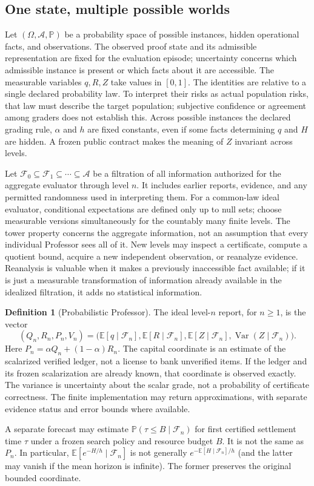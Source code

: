 \documentclass[11pt,letterpaper]{article}
\theoremstyle{definition}\newtheorem{definition}[theorem]{Definition}\newtheorem{example}[theorem]{Example}\newtheorem{conjecture}[theorem]{Conjecture}
\newcommand{\E}{\mathbb E}\newcommand{\PP}{\mathbb P}\newcommand{\F}{\mathcal F}\newcommand{\Var}{\operatorname{Var}}\newcommand{\PC}{\operatorname{PC}}\newcommand{\N}{\mathbb N}
\begin{document}
\subsection{One state, multiple possible worlds}
Let $(\Omega,\mathcal A,\PP)$ be a probability space of possible instances, hidden operational facts, and observations. The observed proof state and its admissible representation are fixed for the evaluation episode; uncertainty concerns which admissible instance is present or which facts about it are accessible. The measurable variables $q,R,Z$ take values in $[0,1]$. The identities are relative to a single declared probability law. To interpret their risks as actual population risks, that law must describe the target population; subjective confidence or agreement among graders does not establish this. Across possible instances the declared grading rule, $\alpha$ and $h$ are fixed constants, even if some facts determining $q$ and $H$ are hidden. A frozen public contract makes the meaning of $Z$ invariant across levels.

Let $\F_0\subseteq\F_1\subseteq\cdots\subseteq\mathcal A$ be a filtration of all information authorized for the aggregate evaluator through level $n$. It includes earlier reports, evidence, and any permitted randomness used in interpreting them. For a common-law ideal evaluator, conditional expectations are defined only up to null sets; choose measurable versions simultaneously for the countably many finite levels. The tower property concerns the aggregate information, not an assumption that every individual Professor sees all of it. New levels may inspect a certificate, compute a quotient bound, acquire a new independent observation, or reanalyze evidence. Reanalysis is valuable when it makes a previously inaccessible fact available; if it is just a measurable transformation of information already available in the idealized filtration, it adds no statistical information.
\begin{definition}[Probabilistic Professor]
The ideal level-$n$ report, for $n\geq1$, is the vector
\[
 (Q_n,R_n,P_n,V_n)=\big(\E[q\mid\F_n],\E[R\mid\F_n],\E[Z\mid\F_n],\Var(Z\mid\F_n)\big).
\]
Here $P_n=\alpha Q_n+(1-\alpha)R_n$. The capital coordinate is an estimate of the scalarized verified ledger, not a license to bank unverified items. If the ledger and its frozen scalarization are already known, that coordinate is observed exactly. The variance is uncertainty about the scalar grade, not a probability of certificate correctness. The finite implementation may return approximations, with separate evidence status and error bounds where available.
\end{definition}
A separate forecast may estimate $\PP(\tau\leq B\mid\F_n)$ for first certified settlement time $\tau$ under a frozen search policy and resource budget $B$. It is not the same as $P_n$. In particular, $\E[e^{-H/h}\mid\F_n]$ is not generally $e^{-\E[H\mid\F_n]/h}$ (and the latter may vanish if the mean horizon is infinite). The former preserves the original bounded coordinate.
\end{document}
